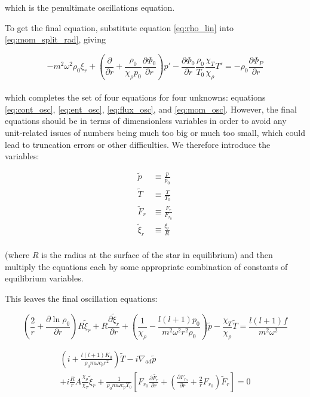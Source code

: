 \documentclass[11pt]{amsart}
\begin{document}
which is the penultimate oscillations equation.

To get the final equation, substitute equation \ref{eq:rho_lin} into \ref{eq:mom_split_rad}, giving

\begin{equation} \label{eq:mom_osc}
- m^{2} \omega^{2} \rho_{0} \xi_{r} 
+ \left( \frac{\partial}{\partial r} + \frac{\rho_{0}}{\chi_{\rho} p_{0}} \frac{\partial \Phi_{0}}{\partial r} \right) p'
-  \frac{\partial \Phi_{0}}{\partial r} \frac{\rho_{0}}{T_{0}} \frac{\chi_{T}}{\chi_{\rho}} T'
=
- \rho_{0} \frac{\partial \Phi_{P}}{\partial r}
\end{equation}
\\
which completes the set of four equations for four unknowns: equations \ref{eq:cont_osc}, \ref{eq:ent_osc}, \ref{eq:flux_osc}, and \ref{eq:mom_osc}.
However, the final equations should be in terms of dimensionless variables in order to avoid
any unit-related issues of numbers being much too big or much too small, which could lead to truncation errors or other difficulties.
We therefore introduce the variables:

\begin{align}
\tilde{p} &\equiv \frac{p}{p_{0}} \\
\tilde{T} &\equiv \frac{T}{T_{0}} \\
\tilde{F}_{r} &\equiv \frac{F_{r}}{F_{r_{0}}} \\
\tilde{\xi}_{r} &\equiv \frac{\xi_{r}}{R}
\end{align}
\\
(where $R$ is the radius at the surface of the star in equilibrium) and then multiply the equations each by some appropriate combination of constants of equilibrium variables.

This leaves the final oscillation equations:

\begin{equation} \label{eq:cont_osc_dim}
\left( \frac{2}{r} + \frac{\partial \ln \rho_{0}}{\partial r} \right) R \tilde{\xi}_{r} + R \frac{\partial \tilde{\xi}_{r}}{\partial r} 
+ \left( \frac{1}{\chi_{\rho}} - \frac{l (l+1) p_{0}}{m^{2} \omega^{2} r^{2} \rho_{0} } \right) \tilde{p}
- \frac{\chi_{T}}{\chi_{\rho}} \tilde{T}
=
\frac{l (l+1) f}{m^{2} \omega^{2}}
\end{equation}

\begin{multline} \label{eq:ent_osc_dim}
\left( i  + \frac{l (l+1) K_{0}}{\rho_{0} m \omega c_{p} r^{2}} \right) \tilde{T}
-  i \nabla_{ad} \tilde{p} \\
+ i \frac{R}{r} A \frac{\chi_{\rho}}{\chi_{T}} \tilde{\xi}_{r}
+ \frac{1}{\rho_{0} m \omega c_{p} T_{0}} \left[ F_{r_{0}} \frac{\partial \tilde{F_{r}}}{\partial r} + \left( \frac{\partial F_{r_{0}}}{\partial r} + \frac{2}{r} F_{r_{0}} \right) \tilde{F}_{r} \right]
=
0
\end{multline}
\end{document}
